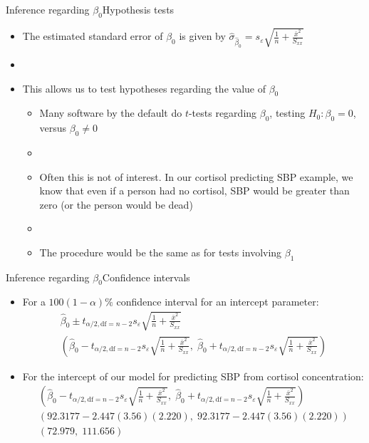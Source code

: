 \documentclass[xcolor=dvipsnames]{beamer}
\begin{document}
\begin{frame}{Inference regarding $\beta_0$}{Hypothesis tests}
	\begin{itemize}
		\item The estimated standard error of $\beta_0$ is given by $\hat{\sigma}_{\hat{\beta}_0} = s_{\varepsilon} \sqrt{\frac{1}{n}+\frac{\bar{x}^2}{S_{xx}}}$ \pause
		\item[]
		\item This allows us to test hypotheses regarding the value of $\beta_0$\pause
		\begin{itemize}
			\item Many software by the default do $t$-tests regarding $\beta_0$, testing $H_0: \beta_0 = 0$, versus $\beta_0 \neq 0$ \pause
			\item[]
			\item Often this is not of interest. In our cortisol predicting SBP example, we know that even if a person had no cortisol, SBP would be greater than zero (or the person would be dead) \pause
			\item[]
			\item The procedure would be the same as for tests involving $\beta_1$
		\end{itemize}
		
	\end{itemize}
\end{frame}

\begin{frame}{Inference regarding $\beta_0$}{Confidence intervals}
	\begin{itemize}
		\item For a $100(1-\alpha)\%$ confidence interval for an intercept parameter: \pause
		\begin{gather*}
		\hat{\beta}_0 \pm t_{\alpha / 2,\text{df}=n-2} {s_{\varepsilon} \sqrt{\frac{1}{n}+\frac{\bar{x}^2}{S_{xx}}}} \\
		\left(\hat{\beta}_0 - t_{\alpha / 2,\text{df}=n-2} {s_{\varepsilon} \sqrt{\frac{1}{n}+\frac{\bar{x}^2}{S_{xx}}}},\; \hat{\beta}_0 + t_{\alpha / 2,\text{df}=n-2} {s_{\varepsilon} \sqrt{\frac{1}{n}+\frac{\bar{x}^2}{S_{xx}}}}\right)
		\end{gather*} \pause
		\item For the intercept of our model for predicting SBP from cortisol concentration: \pause
		\begin{gather*}
		\left(\hat{\beta}_0 - t_{\alpha / 2,\text{df}=n-2} {s_{\varepsilon} \sqrt{\frac{1}{n}+\frac{\bar{x}^2}{S_{xx}}}},\; \hat{\beta}_0 + t_{\alpha / 2,\text{df}=n-2} {s_{\varepsilon} \sqrt{\frac{1}{n}+\frac{\bar{x}^2}{S_{xx}}}}\right) \\
		(92.3177 - 2.447(3.56)(2.220), \; 92.3177 - 2.447(3.56)(2.220)) \\
		(72.979,\; 111.656)
		\end{gather*}
	\end{itemize}
\end{frame}
\end{document}
